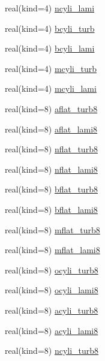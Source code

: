 \begin{DoxyCompactItemize}
real(kind=4) \hyperlink{namespacecanopy__air__coms_a4e37d8368e61b099d262a431a74acd3e}{ncyli\+\_\+lami}
\item 
real(kind=4) \hyperlink{namespacecanopy__air__coms_a3a47f10726cc2b08ff03868bcbbd4445}{bcyli\+\_\+turb}
\item 
real(kind=4) \hyperlink{namespacecanopy__air__coms_a5569cc0028fc90fc9c90e5148b2b6af3}{bcyli\+\_\+lami}
\item 
real(kind=4) \hyperlink{namespacecanopy__air__coms_acb919351d7e124fc10afbf6c0bd1e974}{mcyli\+\_\+turb}
\item 
real(kind=4) \hyperlink{namespacecanopy__air__coms_a9cef6c431c5209b9adb077d5cf7f3184}{mcyli\+\_\+lami}
\item 
real(kind=8) \hyperlink{namespacecanopy__air__coms_a74069fab7440b8c4adf33de11779b980}{aflat\+\_\+turb8}
\item 
real(kind=8) \hyperlink{namespacecanopy__air__coms_af642ae1aafe80d1c6e7fde278a2236df}{aflat\+\_\+lami8}
\item 
real(kind=8) \hyperlink{namespacecanopy__air__coms_afd3231b755fb237410e1c5996483b57e}{nflat\+\_\+turb8}
\item 
real(kind=8) \hyperlink{namespacecanopy__air__coms_af9e1b7d0da6156fb9ca9fc9ae5c8eadc}{nflat\+\_\+lami8}
\item 
real(kind=8) \hyperlink{namespacecanopy__air__coms_acb451ffb0cf75be9e6269398d5404f07}{bflat\+\_\+turb8}
\item 
real(kind=8) \hyperlink{namespacecanopy__air__coms_a81f50c2e4f31633b624d8c3682751b7f}{bflat\+\_\+lami8}
\item 
real(kind=8) \hyperlink{namespacecanopy__air__coms_a68b2e1b18a4e08daa7ddf8aa42b9958d}{mflat\+\_\+turb8}
\item 
real(kind=8) \hyperlink{namespacecanopy__air__coms_a5deb3fac84d48b1bc1dcb105eb01722d}{mflat\+\_\+lami8}
\item 
real(kind=8) \hyperlink{namespacecanopy__air__coms_ace22bf19aec35f5683446ad8de930257}{ocyli\+\_\+turb8}
\item 
real(kind=8) \hyperlink{namespacecanopy__air__coms_a6fe72df71f0ed3c59b06b99e7291d5f5}{ocyli\+\_\+lami8}
\item 
real(kind=8) \hyperlink{namespacecanopy__air__coms_a933920d4f406fd57c33f8cef1ca8bb83}{acyli\+\_\+turb8}
\item 
real(kind=8) \hyperlink{namespacecanopy__air__coms_a325f601d72eb729cc4301008156be76b}{acyli\+\_\+lami8}
\item 
real(kind=8) \hyperlink{namespacecanopy__air__coms_ad86960a7895c92e10af6d10cae324f82}{ncyli\+\_\+turb8}

\end{DoxyCompactItemize}
